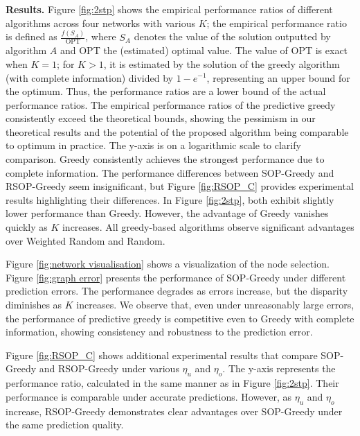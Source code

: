\textbf{Results.} 
Figure \ref{fig:2stp} shows the empirical performance ratios of different algorithms across four networks with various $K$; the empirical performance ratio is defined as $\frac{f(S_{A})}{\text{OPT}}$, where $S_{A}$ denotes the value of the solution outputted by algorithm $A$ and OPT the (estimated) optimal value. The value of OPT is exact when $K = 1$; for $K > 1$, it is estimated by the solution of the greedy algorithm (with complete information) divided by $1 - e^{-1}$, representing an upper bound for the optimum. Thus, the performance ratios are a lower bound of the actual performance ratios. The empirical performance ratios of the predictive greedy consistently exceed the theoretical bounds, showing the pessimism in our theoretical results and the potential of the proposed algorithm being comparable to optimum in practice. The y-axis is on a logarithmic scale to clarify comparison. Greedy consistently achieves the strongest performance due to complete information. The performance differences between SOP-Greedy and RSOP-Greedy seem insignificant, but Figure \ref{fig:RSOP_C} provides experimental results highlighting their differences. In Figure \ref{fig:2stp}, both exhibit slightly lower performance than Greedy. However, the advantage of Greedy vanishes quickly as $K$ increases. All greedy-based algorithms observe significant advantages over Weighted Random and Random. 




Figure \ref{fig:network visualisation} shows a visualization of the node selection. 
Figure \ref{fig:graph error} presents the performance of SOP-Greedy under different prediction errors. The performance degrades as errors increase, but the disparity diminishes as $K$ increases. We observe that, even under unreasonably large errors, the performance of predictive greedy is competitive even to Greedy with complete information, showing consistency and robustness to the prediction error.


Figure \ref{fig:RSOP_C} shows additional experimental results that compare SOP-Greedy and RSOP-Greedy under various $\eta_u$ and $\eta_o$. The y-axis represents the performance ratio, calculated in the same manner as in Figure \ref{fig:2stp}. Their performance is comparable under accurate predictions. However, as $\eta_u$ and $\eta_o$ increase, RSOP-Greedy demonstrates clear advantages over SOP-Greedy under the same prediction quality. 



